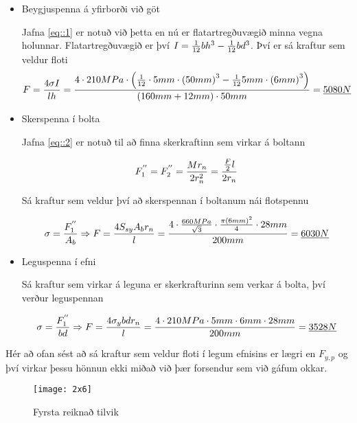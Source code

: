 \begin{itemize}
\item Beygjuspenna á yfirborði við göt
  
  Jafna \ref{eq::1} er notuð við þetta en nú er flatartregðuvægið minna vegna holunnar. 
  Flatartregðuvægið er því $I = {1 \over 12}bh^3 - {1 \over 12}bd^3$. Því er sá kraftur sem veldur floti
  \[
  F = {4 \sigma I \over l h} 
  = {
    4 \cdot 210 MPa \cdot 
    \left(
      {
        1 \over 12
      } 
      \cdot 5 mm \cdot 
      \left(
        50mm
      \right)^3
      - 
      {
        1 \over 12
      } 
      5 mm \cdot 
      \left(
        6mm
      \right)^3
    \right) 
    \over 
    (160 mm + 12 mm) \cdot 50 mm
  } 
  = \underline{5080N}
  \] 

\item Skerspenna í bolta

  Jafna \ref{eq::2} er notuð til að finna skerkraftinn sem virkar á boltann

  \[
  F_1^{''} 
  = F_2^{''} 
  = {Mr_n \over 2r_n^2} 
  = 
  {
    {F \over 2}l \over 2 r_n
  } 
  \]

  Sá kraftur sem veldur því að skerspennan í boltanum nái flotspennu

  \[
  \sigma 
  = {F_1^{''} \over A_b} 
  \Rightarrow 
  F = 
  {
    4 S_{sy} A_b r_n \over l
  } 
  = {
    4 \cdot 
    {
      660MPa \over \sqrt{3}
    } 
    \cdot 
    {
      \pi \left(6mm\right)^2 \over 4
    } 
    \cdot 
    28 mm \over 200 mm
  } 
  = \underline{6030N}
  \]

\item Leguspenna í efni
  
  Sá kraftur sem virkar á leguna er skerkrafturinn sem verkar á bolta, því verður leguspennan
  
  \[
  \sigma 
  = {F_1^{''} \over bd} 
  \Rightarrow 
  F = {4 \sigma_{y} b d r_n \over l} 
  = 
  {
    4 \cdot 210 MPa \cdot 5 mm \cdot 6 mm \cdot 28 mm 
    \over 
    200mm
  } 
  = \underline{3528N}
  \]
\end{itemize}

Hér að ofan sést að sá kraftur sem veldur floti í legum efnisins er lægri en $F_{y,p}$ og því virkar þessu hönnun ekki miðað við þær forsendur sem við gáfum okkar.

\begin{figure}
  \centering
  \texttt{[image: 2x6]}
  \caption{Fyrsta reiknað tilvik}
  \label{fig::2x6}
\end{figure}

